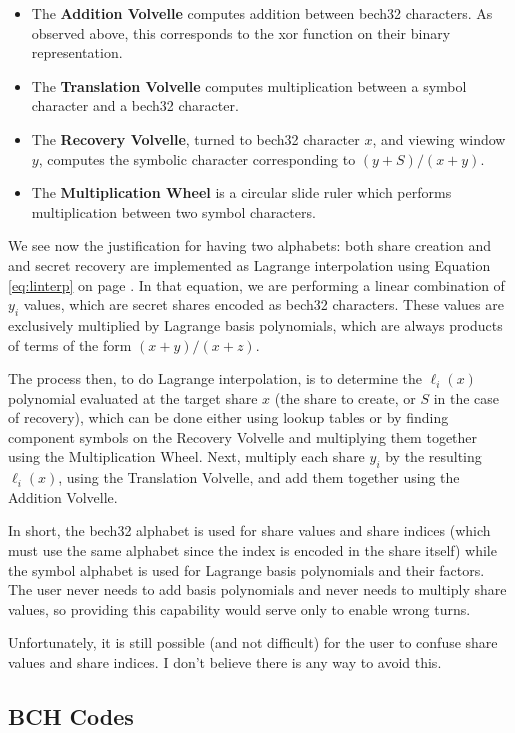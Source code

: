\documentclass[letterpaper]{article}
\theoremstyle{xxx}
\theoremstyle{evil}
\theoremstyle{yyy}
\theoremstyle{plain}
\theoremstyle{zzz}
\begin{document}
\begin{itemize}
\item The \textbf{Addition Volvelle} computes addition between bech32 characters.
As observed above, this corresponds to the xor function on their binary representation.
\item The \textbf{Translation Volvelle} computes multiplication between a symbol
character and a bech32 character. 
\item The \textbf{Recovery Volvelle}, turned to bech32 character $x$, and viewing
window $y$, computes the symbolic character corresponding to $(y + S)/(x + y)$.
\item The \textbf{Multiplication Wheel} is a circular slide ruler which performs
multiplication between two symbol characters.
\end{itemize}

We see now the justification for having two alphabets: both share creation and
and secret recovery are implemented as Lagrange interpolation using Equation
\eqref{eq:linterp} on page \pageref{eq:linterp}. In that equation, we are performing
a linear combination of $y_i$ values, which are secret shares encoded as bech32
characters. These values are exclusively multiplied by Lagrange basis polynomials,
which are always products of terms of the form $(x + y)/(x + z)$.

The process then, to do Lagrange interpolation, is to determine the $\ell_i(x)$
polynomial evaluated at the target share $x$ (the share to create, or $S$ in the case
of recovery), which can be done either using lookup tables or by finding component
symbols on the Recovery Volvelle and multiplying them together using the Multiplication
Wheel. Next, multiply each share $y_i$ by the resulting $\ell_i(x)$, using the Translation
Volvelle, and add them together using the Addition Volvelle.

In short, the bech32 alphabet is used for share values and share indices (which must
use the same alphabet since the index is encoded in the share itself) while the
symbol alphabet is used for Lagrange basis polynomials and their factors. The user
never needs to add basis polynomials and never needs to multiply share values, so
providing this capability would serve only to enable wrong turns.

Unfortunately, it is still possible (and not difficult) for the user to confuse
share values and share indices. I don't believe there is any way to avoid this.

\subsection{BCH Codes}
\end{document}
